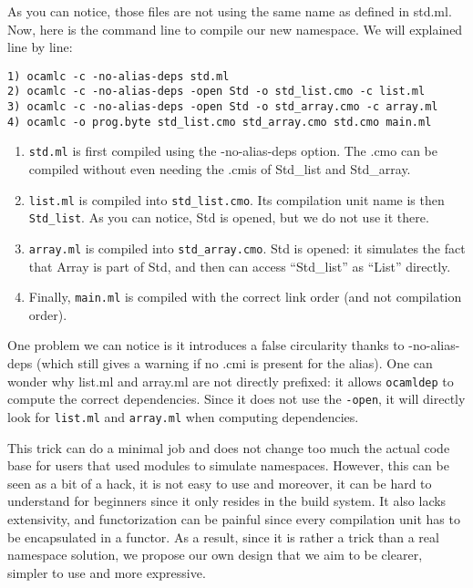 \documentclass[11pt,a4paper]{article}
\begin{document}
As you can notice, those files are not using the same name as defined in
std.ml. Now, here is the command line to compile our new namespace. We will
explained line by line:

\begin{verbatim}
1) ocamlc -c -no-alias-deps std.ml
2) ocamlc -c -no-alias-deps -open Std -o std_list.cmo -c list.ml
3) ocamlc -c -no-alias-deps -open Std -o std_array.cmo -c array.ml
4) ocamlc -o prog.byte std_list.cmo std_array.cmo std.cmo main.ml
\end{verbatim}

\begin{enumerate}
\item \texttt{std.ml} is first compiled using the -no-alias-deps option. The
  .cmo can be compiled without even needing the .cmis of Std\_list and Std\_array.
\item \texttt{list.ml} is compiled into \texttt{std\_list.cmo}. Its compilation
  unit name is then \lstinline{Std_list}. As you can notice, Std is opened, but
  we do not use it there.
\item \texttt{array.ml} is compiled into \texttt{std\_array.cmo}. Std is opened:
  it simulates the fact that Array is part of Std, and then can access
  ``Std\_list'' as ``List'' directly.
\item Finally, \texttt{main.ml} is compiled with the correct link order (and not
  compilation order).
\end{enumerate}

One problem we can notice is it introduces a false circularity thanks to
-no-alias-deps (which still gives a warning if no .cmi is present for the
alias). One can wonder why list.ml and array.ml are not directly prefixed: it
allows \texttt{ocamldep} to compute the correct dependencies. Since it does not
use the \texttt{-open}, it will directly look for \texttt{list.ml} and
\texttt{array.ml} when computing dependencies.

This trick can do a minimal job and does not change too much the actual code
base for users that used modules to simulate namespaces. However, this can be
seen as a bit of a hack, it is not easy to use and moreover, it can be hard to
understand for beginners since it only resides in the build system. It also
lacks extensivity, and functorization can be painful since every compilation
unit has to be encapsulated in a functor. As a result, since it is rather a
trick than a real namespace solution, we propose our own design that we aim to
be clearer, simpler to use and more expressive.
\end{document}
